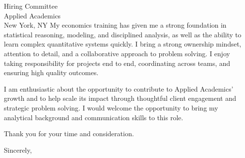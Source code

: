 \documentclass[11pt]{letter}
\begin{document}
\begin{letter}{Hiring Committee \\ Applied Academics \\ New York, NY}
My economics training has given me a strong foundation in statistical reasoning, modeling, and disciplined analysis, as well as the ability to learn complex quantitative systems quickly. I bring a strong ownership mindset, attention to detail, and a collaborative approach to problem solving. I enjoy taking responsibility for projects end to end, coordinating across teams, and ensuring high quality outcomes.

I am enthusiastic about the opportunity to contribute to Applied Academics’ growth and to help scale its impact through thoughtful client engagement and strategic problem solving. I would welcome the opportunity to bring my analytical background and communication skills to this role.

Thank you for your time and consideration.

\closing{Sincerely,}

\end{letter}
\end{document}
